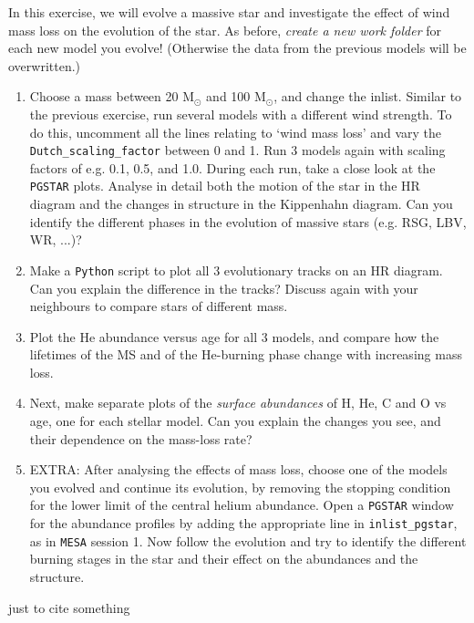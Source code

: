 \documentclass[11pt,a4paper]{article}
\begin{document}
In this exercise, we will evolve a massive star and investigate the effect of wind mass loss on the evolution of the star. As before, \emph{create a new work folder} for each new model you evolve! (Otherwise the data from the previous models will be overwritten.)
\begin{enumerate}
\item Choose a mass between 20 M$_\odot$ and 100 M$_\odot$, and change the inlist. Similar to the previous exercise, run several models with a different wind strength. To do this, uncomment all the lines relating to `wind mass loss' and vary the \verb|Dutch_scaling_factor| between 0 and 1. Run 3 models again with scaling factors of e.g. 0.1, 0.5, and 1.0. During each run, take a close look at the \texttt{PGSTAR} plots. Analyse in detail both the motion of the star in the HR diagram and the changes in structure in the Kippenhahn diagram. Can you identify the different phases in the evolution of massive stars (e.g. RSG, LBV, WR, ...)? %
\item Make a \texttt{Python} script to plot all 3 evolutionary tracks on an HR diagram. Can you explain the difference in the tracks? Discuss again with your neighbours to compare stars of different mass.
\item Plot the He abundance versus age for all 3 models, and compare how the lifetimes of the MS and of the He-burning phase change with increasing mass loss.
\item Next, make separate plots of the \emph{surface abundances} of H, He, C and O vs age, one for each stellar model. Can you explain the changes you see, and their dependence on the mass-loss rate?

\item EXTRA: After analysing the effects of mass loss, choose one of the models you evolved and continue its evolution, by removing the stopping condition for the lower limit of the central helium abundance. Open a \texttt{PGSTAR} window for the abundance profiles by adding the appropriate line in \verb|inlist_pgstar|, as in \texttt{MESA} session 1. Now follow the evolution and try to identify the different burning stages in the star and their effect on the abundances and the structure. 
\end{enumerate}



just to cite something \cite{Paxton2011}



\end{document}
